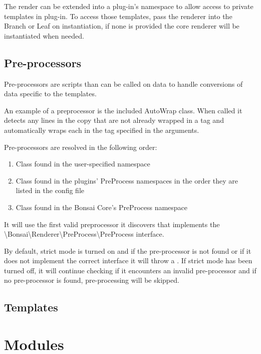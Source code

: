 \documentclass[]{book}
\begin{document}
The render can be extended into a plug-in's namespace to allow access to private templates in plug-in. To access those templates, pass the renderer into the Branch or Leaf on instantiation, if none is provided the core renderer will be instantiated when needed.

\subsection{Pre-processors}

Pre-processors are scripts than can be called on data to handle conversions of data specific to the templates.

An example of a preprocessor is the included AutoWrap class. When called it detects any lines in the copy that are not already wrapped in a tag and automatically wraps each in the tag specified in the arguments.

Pre-processors are resolved in the following order:

\begin{enumerate}
	\item Class found in the user-specified namespace
	\item Class found in the plugins' PreProcess namespaces in the order they are listed in the config file
	\item Class found in the Bonsai Core's PreProcess namespace
\end{enumerate}

It will use the first valid preprocessor it discovers that implements the \textbackslash Bonsai\textbackslash Renderer\textbackslash PreProcess\textbackslash PreProcess interface.

By default, strict mode is turned on and if the pre-processor is not found or if it does not implement the correct interface it will throw a . If strict mode has been turned off, it will continue checking if it encounters an invalid pre-processor and if no pre-processor is found, pre-processing will be skipped.

\subsection{Templates}



\section{Modules}
\end{document}
